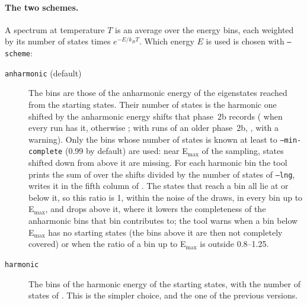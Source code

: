 \paragraph{The two schemes.} A spectrum at temperature $T$ is an average
over the energy bins, each weighted by its number of states times
$e^{-E/k_BT}$. Which energy $E$ is used is chosen with \texttt{--scheme}:
\begin{description}
\item[\texttt{anharmonic} (default)] The bins are those of the
anharmonic energy of the eigenstates reached from the starting states.
Their number of states is the harmonic one shifted by the anharmonic
energy shifts that phase~2b records ( when every run
has it, otherwise ; with runs of an
older phase~2b, , with a warning). Only the bins
whose number of states is known at least to \texttt{--min-complete}
(0.99 by default) are used: near E$_\mathrm{max}$ of the sampling, states
shifted down from above it are missing.
For each harmonic bin the tool prints the sum of  over
the shifts divided by the number of states of \texttt{--lng}, writes it in
the fifth column of . The states that reach a bin
all lie at or below it, so this ratio is 1, within the noise of the draws,
in every bin up to E$_\mathrm{max}$, and drops above it, where it lowers
the completeness of the anharmonic bins that bin contributes to; the tool warns
when a bin below E$_\mathrm{max}$ has no starting states (the bins above it
are then not completely covered) or when the ratio of a bin up to
E$_\mathrm{max}$ is outside 0.8--1.25.
\item[\texttt{harmonic}] The bins of the harmonic energy of the starting
states, with the number of states of . This is the
simpler choice, and the one of the previous versions.
\end{description}

